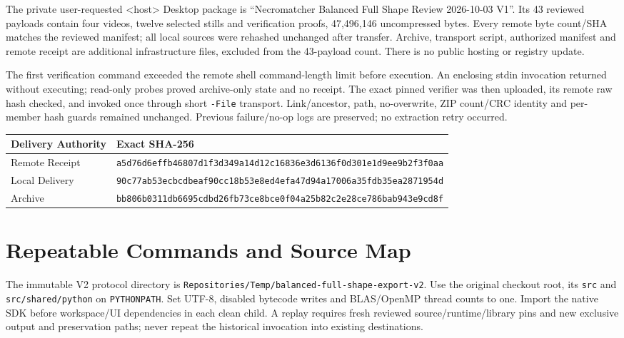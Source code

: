 \documentclass[11pt,letterpaper]{article}
\newcommand{\code}[1]{\nolinkurl{#1}}\newcommand{\hash}[1]{{\footnotesize\nolinkurl{#1}}}
\newcommand{\chapterpage}[1]{\clearpage\section{#1}}
\begin{document}
The private user-requested <host> Desktop package is
``Necromatcher Balanced Full Shape Review 2026-10-03 V1''.
Its 43 reviewed payloads contain four videos, twelve selected stills and verification proofs,
47,496,146 uncompressed bytes. Every remote byte count/SHA matches the reviewed
manifest; all local sources were rehashed unchanged after transfer. Archive, transport
script, authorized manifest and remote receipt are additional infrastructure files,
excluded from the 43-payload count. There is no public hosting or registry update.

The first verification command exceeded the remote shell command-length limit before
execution. An enclosing stdin invocation returned without executing; read-only probes
proved archive-only state and no receipt. The exact pinned verifier was then uploaded,
its remote raw hash checked, and invoked once through short \code{-File} transport.
Link/ancestor, path, no-overwrite, ZIP count/CRC identity and per-member hash guards
remained unchanged. Previous failure/no-op logs are preserved; no extraction retry occurred.

\begin{tabular}{@{}>{\raggedright\arraybackslash}p{1.25in}p{4.55in}@{}}\toprule
Delivery Authority & Exact SHA-256\\\midrule
Remote Receipt & \hash{a5d76d6effb46807d1f3d349a14d12c16836e3d6136f0d301e1d9ee9b2f3f0aa}\\
Local Delivery & \hash{90c77ab53ecbcdbeaf90cc18b53e8ed4efa47d94a17006a35fdb35ea2871954d}\\
Archive & \hash{bb806b0311db6695cdbd26fb73ce8bce0f04a25b82c2e28ce786bab943e9cd8f}\\\bottomrule
\end{tabular}

\chapterpage{Repeatable Commands and Source Map}
The immutable V2 protocol directory is \code{Repositories/Temp/balanced-full-shape-export-v2}.
Use the original checkout root, its \code{src} and \code{src/shared/python} on
\code{PYTHONPATH}. Set UTF-8, disabled bytecode writes and BLAS/OpenMP thread counts to one.
Import the native SDK before workspace/UI dependencies in each clean child.
A replay requires fresh reviewed source/runtime/library pins and new exclusive output
and preservation paths; never repeat the historical invocation into existing destinations.
\end{document}
